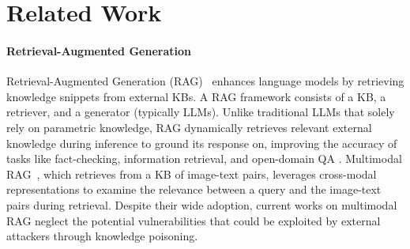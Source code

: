 \section{Related Work}

\paragraph{Retrieval-Augmented Generation}
Retrieval-Augmented Generation (RAG)~\citep{lewis2020retrieval, guu2020realm, borgeaud2022retro, izacard2020leveraging} enhances language models by retrieving knowledge snippets from external KBs. A RAG framework consists of a KB, a retriever, and a generator (typically LLMs). Unlike traditional LLMs that solely rely on parametric knowledge, RAG dynamically retrieves relevant external knowledge during inference to ground its response on, improving the accuracy of tasks like fact-checking, information retrieval, and open-domain QA \citep{izacard2023atlas, borgeaud2022retro}. Multimodal RAG~\cite{chen2022murag, yang2023enhancing, xia2024rule,  sun2024fact}, which retrieves from a KB of image-text pairs, leverages cross-modal representations to examine the relevance between a query and the image-text pairs during retrieval. Despite their wide adoption, current works on multimodal RAG neglect the potential vulnerabilities that could be exploited by external attackers through knowledge poisoning.



